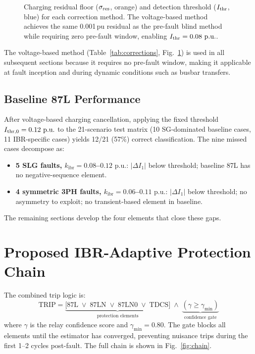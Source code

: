 \documentclass[journal,twoside,10pt]{IEEEtran}
\newcommand{\kibr}{k_{\mathrm{ibr}}}
\newcommand{\pu}{\,\text{p.u.}}
\begin{document}
\begin{figure}[!t]
  \centering
  
  \caption{Charging residual floor ($\sigma_{\rm res}$, orange) and
           detection threshold ($I_{\rm thr}$, blue) for each correction
           method.  The voltage-based method achieves the same 0.001\,pu
           residual as the pre-fault blind method while requiring zero
           pre-fault window, enabling $I_{\rm thr} = 0.08\,\pu$.}
  \label{fig:residual}
\end{figure}

The voltage-based method (Table~\ref{tab:corrections}, Fig.~\ref{fig:residual})
is used in all subsequent sections because it requires no pre-fault window,
making it applicable at fault inception and during dynamic conditions such as
busbar transfers.

\subsection{Baseline 87L Performance}
\label{sec:baseline}

After voltage-based charging cancellation, applying the fixed threshold
$I_{\rm thr,0} = 0.12\,\pu$ to the 21-scenario test matrix
(10 SG-dominated baseline cases, 11 IBR-specific cases) yields 12/21 (57\%)
correct classification.  The nine missed cases decompose as:
\begin{itemize}
  \item \textbf{5 SLG faults, $\kibr = 0.08$--$0.12\,\pu$}: $|\Delta I_1|$
        below threshold; baseline 87L has no negative-sequence element.
  \item \textbf{4 symmetric 3PH faults, $\kibr = 0.06$--$0.11\,\pu$}:
        $|\Delta I_1|$ below threshold; no asymmetry to exploit;
        no transient-based element in baseline.
\end{itemize}
The remaining sections develop the four elements that close these gaps.

\section{Proposed IBR-Adaptive Protection Chain}
\label{sec:chain}

The combined trip logic is:
\begin{equation}
  \mathrm{TRIP} =
  \underbrace{
    \bigl[87\text{L} \;\vee\; 87\text{LN} \;\vee\;
          87\text{LN0} \;\vee\; \text{TDCS}\bigr]
  }_{\text{protection elements}}
  \;\wedge\;
  \underbrace{(\gamma \geq \gamma_{\min})}_{\text{confidence gate}}
  \label{eq:combined}
\end{equation}
where $\gamma$ is the relay confidence score and $\gamma_{\min} = 0.80$.
The gate blocks all elements until the estimator has converged, preventing
nuisance trips during the first 1--2 cycles post-fault.
The full chain is shown in Fig.~\ref{fig:chain}.
\end{document}
